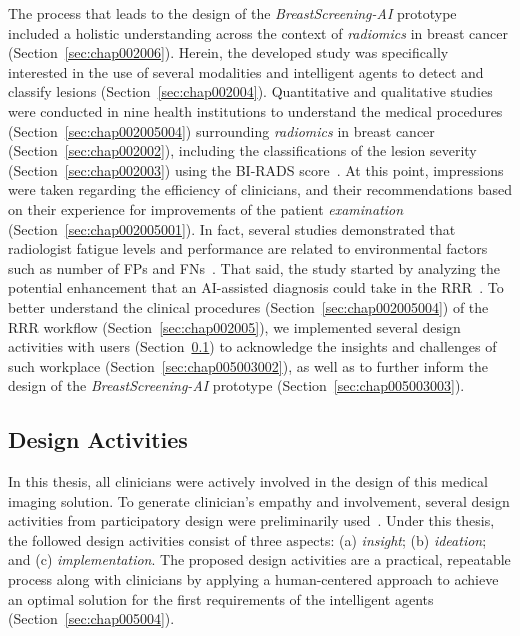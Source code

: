 The process that leads to the design of the {\it BreastScreening-AI} prototype~\cite{https://doi.org/10.13140/rg.2.2.29816.70409} included a holistic understanding across the context of {\it radiomics} in breast cancer (Section~\ref{sec:chap002006}).
Herein, the developed study was specifically interested in the use of several modalities and intelligent agents to detect and classify lesions (Section~\ref{sec:chap002004}).
Quantitative and qualitative studies were conducted in nine health institutions to understand the medical procedures (Section~\ref{sec:chap002005004}) surrounding {\it radiomics} in breast cancer (Section~\ref{sec:chap002002}), including the classifications of the lesion severity (Section~\ref{sec:chap002003}) using the \ac{BI-RADS} score~\cite{https://doi.org/10.13140/rg.2.2.36306.86725}.
At this point, impressions were taken regarding the efficiency of clinicians, and their recommendations based on their experience for improvements of the patient {\it examination} (Section~\ref{sec:chap002005001}).
In fact, several studies demonstrated that radiologist fatigue levels and performance are related to environmental factors such as number of \acp{FP} and \acp{FN}~\cite{waite2017tired}.
That said, the study started by analyzing the potential enhancement that an \ac{AI}-assisted diagnosis could take in the \ac{RRR}~\cite{chatelain2018evaluation, miglioretti2007radiologist}.
To better understand the clinical procedures (Section~\ref{sec:chap002005004}) of the \ac{RRR} workflow (Section~\ref{sec:chap002005}), we implemented several design activities with users (Section~\ref{sec:chap005003001}) to acknowledge the insights and challenges of such workplace (Section~\ref{sec:chap005003002}), as well as to further inform the design of the {\it BreastScreening-AI} prototype (Section~\ref{sec:chap005003003}).

\subsection{Design Activities}
\label{sec:chap005003001}

In this thesis, all clinicians were actively involved in the design of this medical imaging solution.
To generate clinician's empathy and involvement, several design activities from participatory design were preliminarily used~\cite{10.1145/3308558.3314123}.
Under this thesis, the followed design activities consist of three aspects: (a) {\it insight}; (b) {\it ideation}; and (c) {\it implementation}.
The proposed design activities are a practical, repeatable process along with clinicians by applying a human-centered approach to achieve an optimal solution for the first requirements of the intelligent agents (Section~\ref{sec:chap005004}).

